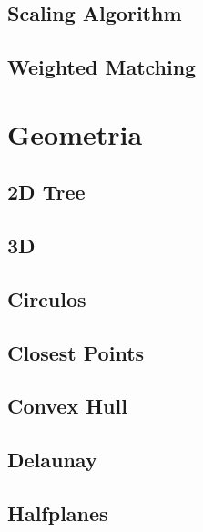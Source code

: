 \subsection{Scaling Algorithm}
\raggedbottom
\hrulefill
\subsection{Weighted Matching}
\raggedbottom
\hrulefill

\section{Geometria}
\subsection{2D Tree}
\raggedbottom
\hrulefill
\subsection{3D}
\raggedbottom
\hrulefill
\subsection{Circulos}
\raggedbottom
\hrulefill
\subsection{Closest Points}
\raggedbottom
\hrulefill
\subsection{Convex Hull}
\raggedbottom
\hrulefill
\subsection{Delaunay}
\raggedbottom
\hrulefill
\subsection{Halfplanes}
\raggedbottom
\hrulefill
